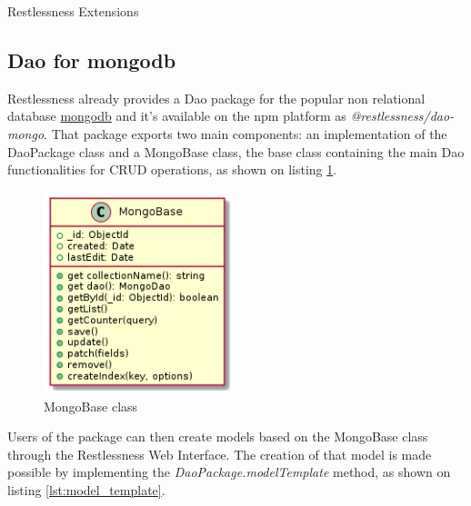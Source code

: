 \begin{chapter}{Restlessness Extensions}
    \subsection{Dao for mongodb}
    Restlessness already provides a Dao package for the popular non relational
    database \href{https://www.mongodb.com/}{mongodb} and it's available on the
    npm platform as \mbox{\textit{@restlessness/dao-mongo}}.
    That package exports two main components: an implementation of the DaoPackage
    class and a MongoBase class, the base class containing the main Dao
    functionalities for CRUD operations, as shown on listing \ref{fig:mongobase}.

    \begin{figure}
        \centering
        \includegraphics[width=5.5cm]{source/diagrams/mongobase_class.png}
        \caption{MongoBase class}
        \label{fig:mongobase}
    \end{figure}

    Users of the package can then create models based on the MongoBase class through
    the Restlessness Web Interface.
    The creation of that model is made possible by implementing the
    \textit{DaoPackage.modelTemplate} method, as shown on listing \ref{lst:model_template}.

    \bigskip


\end{chapter}
